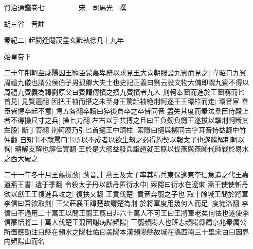 資治通鑑卷七　　　　　宋　司馬光　撰

胡三省　音註

秦紀二|{
	起閼逢閹茂盡玄黓執徐几十九年}


始皇帝下

二十年荆軻至咸陽因王寵臣蒙嘉卑辭以求見王大喜朝服設九賓而見之|{
	韋昭曰九賓周禮九儀也謂公侯伯子男孤卿大夫士也史記正義曰劉云設文物大備即謂九賓不得以周禮九賓義為釋劉原父曰賓謂傳擯之擯九賓擯者九人}
荆軻奉圖而進於王圖窮而匕首見|{
	見賢遍翻}
因把王袖而揕之未至身王驚起袖絶荆軻逐王王環柱而走|{
	環音宦}
羣臣皆愕卒起不意|{
	愕五各翻卒讀曰猝後倉卒之卒皆同音}
盡失其度而秦法羣臣侍殿上者不得操尺寸之兵|{
	操七刀翻}
左右以手共搏之且曰王負劒負劒王遂拔以擊荆軻斷其左股|{
	斷丁管翻}
荆軻廢乃引匕首擿王中銅柱|{
	索隱曰擿與擲同古字耳音持益翻中竹仲翻}
自知事不就罵曰事所以不成者以欲生刼之必得約契以報太子也遂體解荆軻以徇|{
	體解支解也解佳買翻}
王於是大怒益發兵詣趙就王翦以伐燕與燕師代師戰於易水之西大破之

二十一年冬十月王翦拔薊|{
	薊音計}
燕王及太子率其精兵東保遼東李信急追之代王嘉遺燕王書|{
	遺于季翻}
令殺太子丹以獻丹匿衍水中|{
	索隱曰衍水在遼東}
燕王使使斬丹欲以獻王王復進兵攻之|{
	復扶又翻}
王賁伐楚|{
	賁音奔翦之子也}
取十餘城王問於將軍李信曰吾欲取荆|{
	王父莊襄王諱楚故謂楚為荆}
於將軍度用幾何人而足|{
	度徒洛翻}
李信曰不過用二十萬王以問王翦王翦曰非六十萬人不可王曰王將軍老矣何怯也遂使李信蒙恬將二十萬人伐楚王翦因謝病歸頻陽|{
	王翦頻陽人也班志頻陽縣屬京兆秦厲公所置應劭注曰縣在頻水之陽杜佑曰美陽本漢頻陽縣故城在縣西南三十里宋白曰因界内頻陽山而名}


